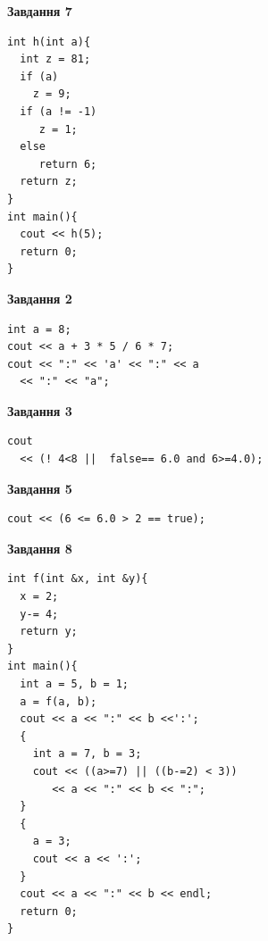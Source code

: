 \documentclass[12pt, ukrainian]{article}
\begin{document}
{\begin {large}
\begin{minipage}[t]{7.0cm}
\begin{center}
\textbf{Завдання 7}
\end{center}
\vspace{-8mm}

\begin{verbatim}
int h(int a){
  int z = 81;
  if (a)
    z = 9;
  if (a != -1)
     z = 1;
  else
     return 6;
  return z;
}
int main(){
  cout << h(5);
  return 0;
}
\end{verbatim}

\end{minipage}
\vline \hspace{1mm}
\begin{minipage}[t]{11.0cm}

\begin{center}
\textbf{Завдання 2}
\end{center}
\vspace{-8mm}

\begin{verbatim}
int a = 8;
cout << a + 3 * 5 / 6 * 7;
cout << ":" << 'a' << ":" << a 
  << ":" << "a";
\end{verbatim}



\begin{center}
\textbf{Завдання 3}
\end{center}
\vspace{-8mm}

\begin{verbatim}
cout 
  << (! 4<8 ||  false== 6.0 and 6>=4.0);
\end{verbatim}



\begin{center}
\textbf{Завдання 5}
\end{center}
\vspace{-8mm}

\begin{verbatim}
cout << (6 <= 6.0 > 2 == true);
\end{verbatim}



\begin{center}
\textbf{Завдання 8}
\end{center}
\vspace{-8mm}

\begin{verbatim}
int f(int &x, int &y){
  x = 2;
  y-= 4;
  return y;
}
int main(){
  int a = 5, b = 1;
  a = f(a, b);
  cout << a << ":" << b <<':';
  {
    int a = 7, b = 3;
    cout << ((a>=7) || ((b-=2) < 3))
       << a << ":" << b << ":";
  }
  {
    a = 3;
    cout << a << ':';
  }
  cout << a << ":" << b << endl;
  return 0;
}
\end{verbatim}


\end{minipage}
\end{large}}
\end{document}
